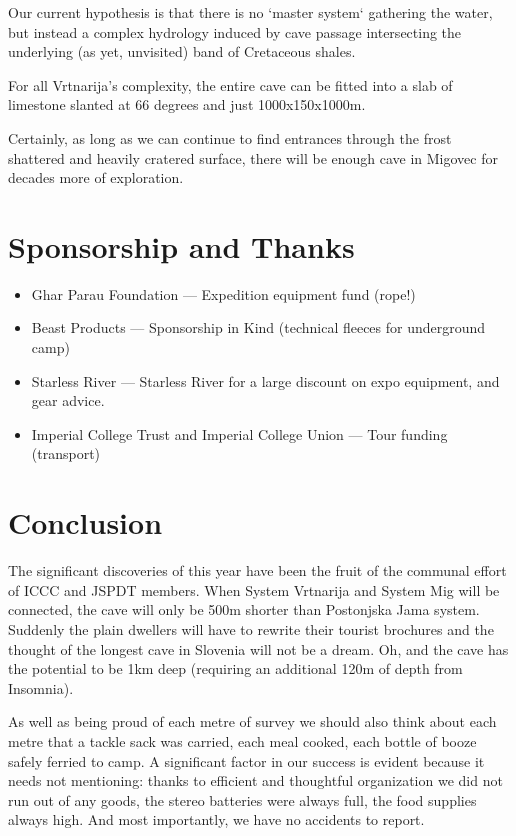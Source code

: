 \documentclass[english,a4]{article}
\begin{document}
Our current hypothesis is that there is no `master system` gathering the water,
but instead a complex hydrology induced by cave passage intersecting the
underlying (as yet, unvisited) band of Cretaceous shales.

For all Vrtnarija's complexity, the entire cave can be fitted into
a slab of limestone slanted at 66 degrees and just 1000x150x1000m.

Certainly, as long as we can continue to find entrances through the frost
shattered and heavily cratered surface, there will be enough cave in Migovec
for decades more of exploration.

\section{Sponsorship and Thanks}

\begin{itemize}
\item{Ghar Parau Foundation --- Expedition equipment fund (rope!)}
\item{Beast Products --- Sponsorship in Kind (technical fleeces for underground
camp)}
\item{Starless River --- Starless River for a large discount on expo equipment,
and gear advice.}
\item{Imperial College Trust and Imperial College Union --- Tour funding (transport) }
\end{itemize}

\section{Conclusion}

The significant discoveries of this year have been the fruit of the
communal effort of ICCC and JSPDT members. When System Vrtnarija and
System Mig will be connected, the cave will only be 500m shorter than
Postonjska Jama system. Suddenly the plain dwellers will have to rewrite
their tourist brochures and the thought of the longest cave in Slovenia
will not be a dream. Oh, and the cave has the potential to be 1km
deep (requiring an additional 120m of depth from Insomnia).

As well as being proud of each metre of survey we should also think
about each metre that a tackle sack was carried, each meal cooked,
each bottle of booze safely ferried to camp. A significant factor
in our success is evident because it needs not mentioning: thanks
to efficient and thoughtful organization we did not run out of any
goods, the stereo batteries were always full, the food supplies always
high. And most importantly, we have no accidents to report.
\end{document}
